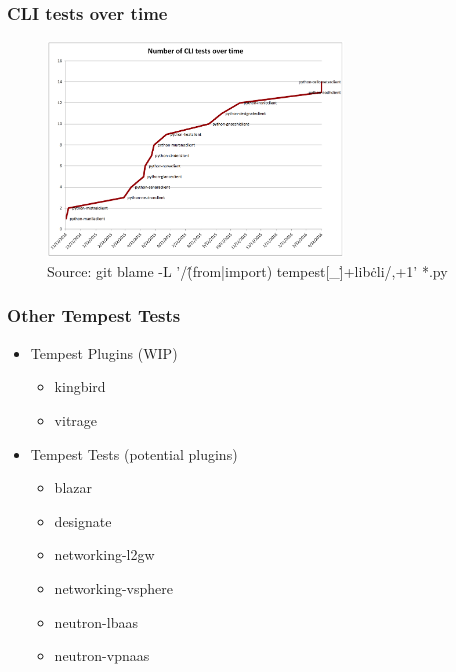 \documentclass[aspectratio=169,11pt,hyperref={colorlinks=true}]{beamer}
\begin{document}
\begin{frame}
    \frametitle{CLI tests over time}
    \begin{figure}[p]
    	\centering
    	\includegraphics[width=0.7\textwidth]{cli-tests.png}
        \caption{Source: git blame -L '/\^(from|import) tempest[\_\.]+lib\.cli/,+1' *.py}
    \end{figure}
\end{frame}

\begin{frame}
    \frametitle{Other Tempest Tests}
    \begin{itemize}
        \item{Tempest Plugins (WIP)}
            \begin{itemize}
                \item{kingbird}
                \item{vitrage}
            \end{itemize}
    \end{itemize}
    \begin{itemize}
        \item{Tempest Tests (potential plugins)}
            \begin{itemize}
                \item{blazar}
                \item{designate}
                \item{networking-l2gw}
                \item{networking-vsphere}
                \item{neutron-lbaas}
                \item{neutron-vpnaas}
            \end{itemize}
    \end{itemize}
\end{frame}
\end{document}
